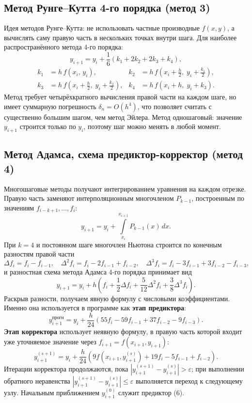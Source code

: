 \documentclass[12pt,a4paper]{article}
\begin{document}
\subsection{Метод Рунге--Кутта 4-го порядка (метод 3)}
Идея методов Рунге--Кутта: не использовать частные производные $f(x,y)$,
а вычислять саму правую часть в нескольких точках внутри шага. Для наиболее
распространённого метода 4-го порядка:
\begin{equation}
y_{i+1}=y_i+\frac{1}{6}\left(k_1+2k_2+2k_3+k_4\right),
\end{equation}
\begin{equation}
\begin{aligned}
k_1&=h\,f(x_i,\,y_i), &
k_2&=h\,f\!\left(x_i+\tfrac{h}{2},\;y_i+\tfrac{k_1}{2}\right),\\
k_3&=h\,f\!\left(x_i+\tfrac{h}{2},\;y_i+\tfrac{k_2}{2}\right), &
k_4&=h\,f\!\left(x_i+h,\;y_i+k_3\right).
\end{aligned}
\end{equation}
Метод требует четырёхкратного вычисления правой части на каждом шаге,
но имеет суммарную погрешность $\delta_n=O(h^4)$, что позволяет считать
с существенно большим шагом, чем метод Эйлера. Метод одношаговый: значение
$y_{i+1}$ строится только по $y_i$, поэтому шаг можно менять в любой момент.

\subsection{Метод Адамса, схема предиктор-корректор (метод 4)}
Многошаговые методы получают интегрированием уравнения на каждом отрезке.
Правую часть заменяют интерполяционным многочленом $P_{k-1}$, построенным
по значениям $f_{i-k+1},\dots,f_i$:
\[
y_{i+1}=y_i+\int\limits_{x_i}^{x_{i+1}}P_{k-1}(x)\,dx .
\]
При $k=4$ и постоянном шаге многочлен Ньютона строится по конечным разностям
правой части
\[
\Delta f_i=f_i-f_{i-1},\quad
\Delta^2f_i=f_i-2f_{i-1}+f_{i-2},\quad
\Delta^3f_i=f_i-3f_{i-1}+3f_{i-2}-f_{i-3},
\]
и разностная схема метода Адамса 4-го порядка принимает вид
\begin{equation}
y_{i+1}=y_i+h\left(f_i+\frac{1}{2}\Delta f_i+\frac{5}{12}\Delta^2f_i
+\frac{3}{8}\Delta^3f_i\right).
\end{equation}
Раскрыв разности, получаем явную формулу с числовыми коэффициентами.
Именно она используется в программе как \textbf{этап предиктора}:
\begin{equation}
y_{i+1}^{\text{прогн}}=y_i+\frac{h}{24}\left(55f_i-59f_{i-1}+37f_{i-2}-9f_{i-3}\right).
\end{equation}
\textbf{Этап корректора} использует неявную формулу, в правую часть которой
входит уже уточняемое значение через $f_{i+1}=f(x_{i+1},y_{i+1})$:
\begin{equation}
y_{i+1}^{(s+1)}=y_i+\frac{h}{24}\left(9f\!\left(x_{i+1},y_{i+1}^{(s)}\right)
+19f_i-5f_{i-1}+f_{i-2}\right).
\end{equation}
Итерации корректора продолжаются, пока
$\left|y_{i+1}^{(s+1)}-y_{i+1}^{(s)}\right|>\varepsilon$; при выполнении
обратного неравенства $\left|y_{i+1}^{(s+1)}-y_{i+1}^{(s)}\right|\le\varepsilon$
выполняется переход к следующему узлу. Начальным
приближением $y_{i+1}^{(0)}$ служит предиктор (6).
\end{document}
